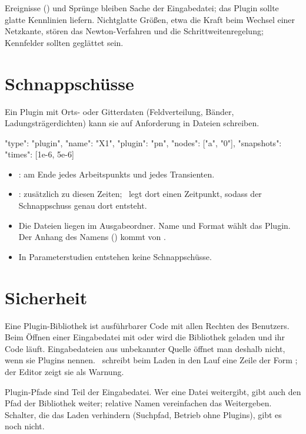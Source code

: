 Ereignisse () und Sprünge bleiben Sache der Eingabedatei; das
Plugin sollte glatte Kennlinien liefern. Nichtglatte Größen, etwa die Kraft
beim Wechsel einer Netzkante, stören das Newton-Verfahren und die
Schrittweitenregelung; Kennfelder sollten geglättet sein.

\section{Schnappschüsse}
\label{sec:plugin-schnappschuesse}

Ein Plugin mit Orts- oder Gitterdaten (Feldverteilung, Bänder,
Ladungsträgerdichten) kann sie auf Anforderung in Dateien schreiben.

\begin{json}
{ "type": "plugin", "name": "X1", "plugin": "pn", "nodes": ["a", "0"],
  "snapshots": { "times": [1e-6, 5e-6] } }
\end{json}

\begin{itemize}
  \item {}: am Ende jedes Arbeitspunkts und jedes
    Transienten.
  \item {}: zusätzlich zu diesen Zeiten; \esim\ legt dort
    einen Zeitpunkt, sodass der Schnappschuss genau dort entsteht.
  \item Die Dateien liegen im Ausgabeordner. Name und Format wählt das Plugin.
    Der Anhang des Namens ()
    kommt von \esim.
  \item In Parameterstudien entstehen keine Schnappschüsse.
\end{itemize}

\section{Sicherheit}
\label{sec:plugin-sicherheit}

Eine Plugin-Bibliothek ist ausführbarer Code mit allen Rechten des Benutzers.
Beim Öffnen einer Eingabedatei mit  oder  wird die
Bibliothek geladen und ihr Code läuft. Eingabedateien aus unbekannter Quelle
öffnet man deshalb nicht, wenn sie Plugins nennen. \esim\ schreibt beim Laden in
den Lauf eine Zeile der Form
; der Editor zeigt sie als Warnung.

\begin{achtung}
  Plugin-Pfade sind Teil der Eingabedatei. Wer eine Datei weitergibt, gibt
  auch den Pfad der Bibliothek weiter; relative Namen vereinfachen das
  Weitergeben. Schalter, die das Laden verhindern (Suchpfad, Betrieb ohne
  Plugins), gibt es noch nicht.
\end{achtung}

